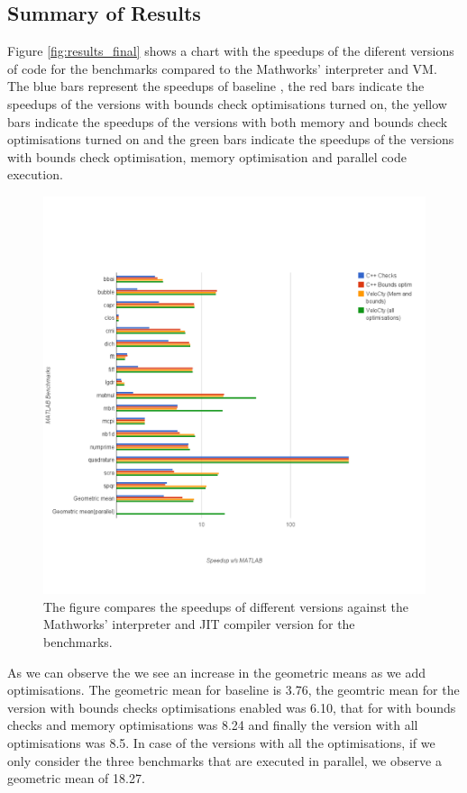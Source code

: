 \subsection{Summary of \matlab Results}
Figure \ref{fig:results_final} shows a chart with the speedups of the diferent versions of \velocty code for the \matlab benchmarks compared to the Mathworks' \matlab interpreter and VM. The blue bars represent the speedups of baseline \velocty, the red bars indicate the speedups of the \velocty versions with bounds check optimisations turned on, the yellow bars indicate the speedups of the \velocty versions with both memory and bounds check optimisations turned on and the green bars indicate the speedups of the \velocty versions with bounds check optimisation, memory optimisation and parallel code execution. 
\begin{figure}[htbp]
\centering
\includegraphics[scale=0.45]{Figures/final_mat.png}
\caption{The figure compares the speedups of different \velocty versions against the Mathworks' interpreter and JIT compiler version for the \matlab benchmarks.}
\label{fig:results_mat}
\end{figure}

As we can observe the we see an increase in the geometric means as we add optimisations. The geometric mean for baseline \velocty is 3.76, the geomtric mean for the \velocty version with bounds checks optimisations enabled was 6.10, that for \velocty with bounds checks and memory optimisations was 8.24 and finally the version with all optimisations was 8.5. In case of the \velocty versions with all the optimisations, if we only consider the three benchmarks that are executed in parallel, we observe a geometric mean of 18.27.

